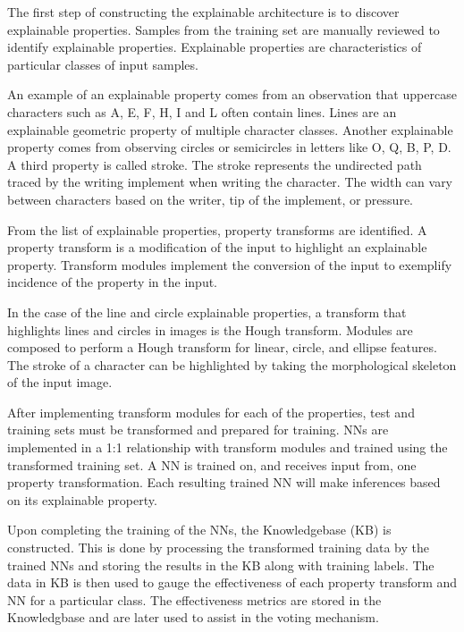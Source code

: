 \documentclass[conference]{IEEEtran}
\begin{document}

The first step of constructing the explainable architecture is to discover explainable properties.
Samples from the training set are manually reviewed to identify explainable
properties. Explainable properties are characteristics of particular classes of
input samples.

An example of an explainable property comes from an observation that uppercase
characters such as A, E, F, H, I and L often contain lines. Lines are an
explainable geometric property of multiple character classes. Another
explainable property comes from observing circles or semicircles in letters like
O, Q, B, P, D. A third property is called stroke.  The stroke represents the
undirected path traced by the writing implement when writing the character.  The
width can vary between characters based on the writer, tip of the implement, or
pressure.

From the list of explainable properties, property transforms are identified.  A
property transform is a modification of the input to highlight an explainable
property.  Transform modules implement the conversion of the input to exemplify
incidence of the property in the input.

In the case of the line and circle explainable properties, a transform that
highlights lines and circles in images is the Hough
transform\cite{Hough1959qva}.  Modules are composed to perform a Hough
transform for linear, circle, and ellipse features.  The stroke of a character
can be highlighted by taking the morphological skeleton\cite{LEE1994} of the
input image.

After implementing transform modules for each of the properties, test and
training sets must be transformed and prepared for training. NNs are implemented
in a 1:1 relationship with transform modules and trained using the transformed
training set.  A NN is trained on, and receives input from, one property
transformation.  Each resulting trained NN will make inferences based on its
explainable property.

Upon completing the training of the NNs, the Knowledgebase (KB) is constructed.
This is done by processing the transformed training data by the trained NNs and
storing the results in the KB along with training labels.  The data in KB is
then used to gauge the effectiveness of each property transform and NN for a
particular class.  The effectiveness metrics are stored in the Knowledgbase and
are later used to assist in the voting mechanism.
\end{document}
